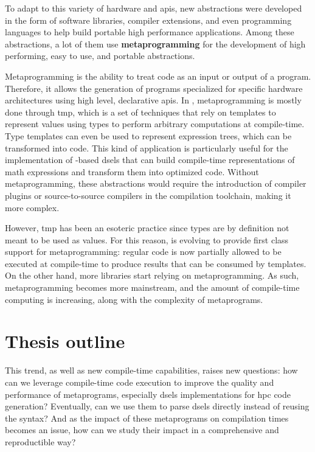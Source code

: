 \documentclass[main]{subfiles}
\begin{document}
To adapt to this variety of hardware and \glspl{api}, new abstractions
were developed in the form of software libraries, compiler extensions,
and even programming languages to help build portable high performance
applications.
Among these abstractions, a lot of them use \textbf{metaprogramming} for the
development of high performing, easy to use, and portable abstractions.

Metaprogramming is the ability to treat code as an input or output of a program.
Therefore, it allows the generation of programs specialized for
specific hardware architectures using high level, declarative \glspl{api}.
In \cpp, metaprogramming is mostly done through \gls{tmp}, which is a set of
techniques that rely on \cpp templates to represent values using types to
perform arbitrary computations at compile-time.
Type templates can even be used to represent expression trees,
which can be transformed into code. This kind of application is particularly
useful for the implementation of \cpp-based \glspl{dsel} that can build
compile-time representations of math expressions and transform them into
optimized code. Without metaprogramming, these abstractions would require
the introduction of compiler plugins or source-to-source compilers in the
compilation toolchain, making it more complex.

However, \gls{tmp} has been an esoteric practice since types are by definition
not meant to be used as values. For this reason, \cpp is evolving to provide
first class support for metaprogramming: regular \cpp code is now partially
allowed to be executed at compile-time to produce results that can be consumed
by templates. On the other hand, more \cpp libraries start relying on \cpp
metaprogramming. As such, \cpp metaprogramming becomes more mainstream,
and the amount of compile-time computing is increasing, along with
the complexity of \cpp metaprograms.
\\


\section*{
  Thesis outline
}

This trend, as well as new \cpp compile-time capabilities, raises new questions:
how can we leverage compile-time \cpp code execution to improve the quality
and performance of \cpp metaprograms, especially \glspl{dsel} implementations
for \acrlong{hpc} code generation? Eventually, can we use them to parse
\glspl{dsel} directly instead of reusing the \cpp syntax?
And as the impact of these metaprograms on compilation times becomes an issue,
how can we study their impact in a comprehensive and reproductible way?
\\
\end{document}
